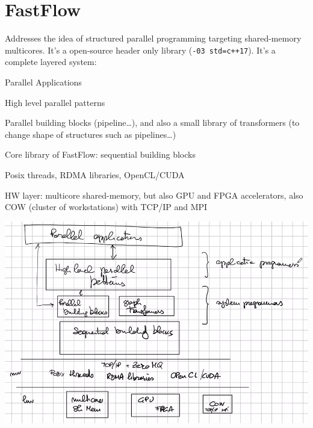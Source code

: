 \documentclass[10pt]{report}
\begin{document}
\section{FastFlow}
Addresses the idea of structured parallel programming targeting shared-memory multicores. It's a open-source header only library (\texttt{-03 std=c++17}). It's a complete layered system:\begin{list}{}{}
	\item Parallel Applications
	\item \begin{list}{}{}
		\item High level parallel patterns
		\item Parallel building blocks (pipeline\ldots), and also a small library of transformers (to change shape of structures such as pipelines\ldots)
		\item Core library of FastFlow: sequential building blocks
	\end{list}
	\item Posix threads, RDMA libraries, OpenCL/CUDA
	\item HW layer: multicore shared-memory, but also GPU and FPGA accelerators, also COW (cluster of workstations) with TCP/IP and MPI
\end{list}
\begin{center}
	\includegraphics[scale=0.5]{16.png}
\end{center}
\end{document}
